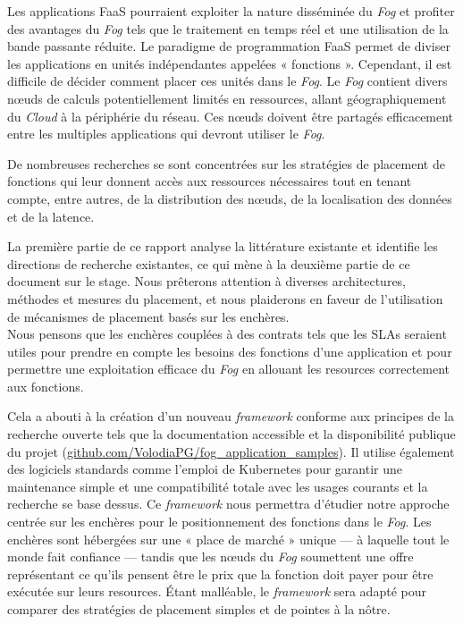 Les applications \gls{FaaS} pourraient exploiter la nature disséminée du \emph{Fog} et profiter des avantages du \emph{Fog} tels que le traitement en temps réel et une utilisation de la bande passante réduite. Le paradigme de programmation \gls{FaaS} permet de diviser les applications en unités indépendantes appelées « fonctions ». Cependant, il est difficile de décider comment placer ces unités dans le \emph{Fog}. Le \emph{Fog} contient divers nœuds de calculs potentiellement limités en ressources, allant géographiquement du \emph{Cloud} à la périphérie du réseau. Ces nœuds doivent être partagés efficacement entre les multiples applications qui devront utiliser le \emph{Fog}.

De nombreuses recherches se sont concentrées sur les stratégies de placement de fonctions qui leur donnent accès aux ressources nécessaires tout en tenant compte, entre autres, de la distribution des nœuds, de la localisation des données et de la latence.

La première partie de ce rapport analyse la littérature existante et identifie les directions de recherche existantes, ce qui mène à la deuxième partie de ce document sur le stage. Nous prêterons attention à diverses architectures, méthodes et mesures du placement, et nous plaiderons en faveur de l'utilisation de mécanismes de placement basés sur les enchères.\\
Nous pensons que les enchères couplées à des contrats tels que les \glspl{SLA} seraient utiles pour prendre en compte les besoins des fonctions d'une application et pour permettre une exploitation efficace du \emph{Fog} en allouant les resources correctement aux fonctions.

Cela a abouti à la création d'un nouveau \emph{framework} conforme aux principes de la recherche ouverte tels que la documentation accessible et la disponibilité publique du projet (\href{https://github.com/VolodiaPG/fog_application_samples}{github.com/VolodiaPG/fog\_application\_samples}). Il utilise également des logiciels standards comme l'emploi de Kubernetes pour garantir une maintenance simple et une compatibilité totale avec les usages courants et la recherche se base dessus. Ce \emph{framework} nous permettra d'étudier notre approche centrée sur les enchères pour le positionnement des fonctions dans le \emph{Fog}. Les enchères sont hébergées sur une « place de marché » unique — à laquelle tout le monde fait confiance — tandis que les nœuds du \emph{Fog} soumettent une offre représentant ce qu'ils pensent être le prix que la fonction doit payer pour être exécutée sur leurs resources. Étant malléable, le \emph{framework} sera adapté pour comparer des stratégies de placement simples et de pointes à la nôtre.


